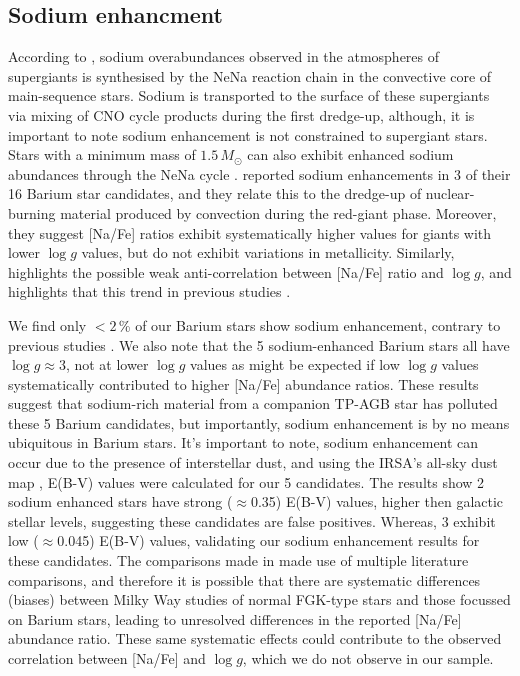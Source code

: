 \documentclass[a4paper,fleqn,usenatbib]{mnras}
\begin{document}
\subsection{Sodium enhancment}
According to \citet{el1995}, sodium overabundances observed in the atmospheres of supergiants is synthesised by the NeNa reaction chain in the convective core of main-sequence stars. Sodium is transported to the surface of these supergiants via mixing of CNO cycle products during the first dredge-up, although, it is important to note sodium enhancement is not constrained to supergiant stars. Stars with a  minimum mass of $1.5\,M_\odot$ can also exhibit enhanced sodium abundances through the NeNa cycle \citep{denissenkov1987}. \citet{antipova2004} reported sodium enhancements in 3 of their 16 Barium star candidates, and they relate this to the dredge-up of nuclear-burning material produced by convection during the red-giant phase. Moreover, they suggest [Na/Fe] ratios exhibit systematically higher values for giants with lower $\log{g}$ values, but do not exhibit variations in metallicity. Similarly, \citet{decastro2016} highlights the possible weak anti-correlation between [Na/Fe] ratio and $\log{g}$, and highlights that this trend in previous studies \citep[e.g.][]{boyarchuk2002,mishenina2006,luck2007,takeda2008}.

We find only $<2$\,\% of our Barium stars show sodium enhancement, contrary to previous studies \citep[e.g.][]{decastro2016}. We also note that the 5 sodium-enhanced Barium stars all have $\log{g} \approx 3$, not at lower $\log{g}$ values as might be expected if low $\log{g}$ values systematically contributed to higher [Na/Fe] abundance ratios. These results suggest that sodium-rich material from a companion TP-AGB star has polluted these 5 Barium candidates, but importantly, sodium enhancement is by no means ubiquitous in Barium stars. It's important to note, sodium enhancement can occur due to the presence of interstellar dust, and using the IRSA's all-sky dust map \citep{schlafly2011}, E(B-V) values were calculated for our 5 candidates. The results show 2 sodium enhanced stars have strong ($\approx$0.35) E(B-V) values, higher then galactic stellar levels, suggesting these candidates are false positives. Whereas, 3 exhibit low ($\approx$0.045) E(B-V) values, validating our sodium enhancement results for these candidates. The comparisons made in \citep{decastro2016} made use of multiple literature comparisons, and therefore it is possible that there are systematic differences (biases) between Milky Way studies of normal FGK-type stars and those focussed on Barium stars, leading to unresolved differences in the reported [Na/Fe] abundance ratio. These same systematic effects could contribute to the observed correlation between [Na/Fe] and $\log{g}$, which we do not observe in our sample. 
\end{document}
